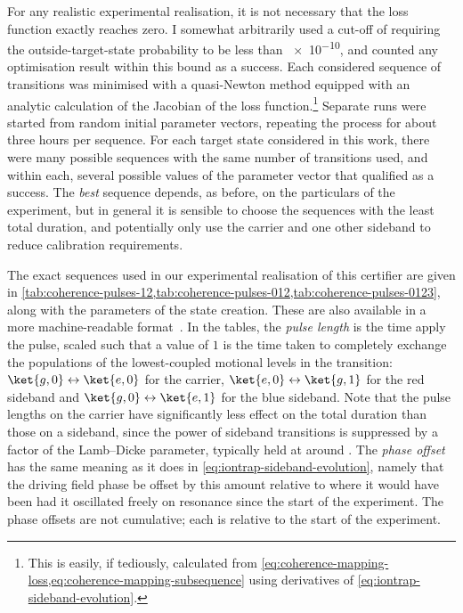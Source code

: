 For any realistic experimental realisation, it is not necessary that the loss function exactly reaches zero.
I somewhat arbitrarily used a cut-off of requiring the outside-target-state probability to be less than \num{e-10}, and counted any optimisation result within this bound as a success.
Each considered sequence of transitions was minimised with a quasi-Newton method equipped with an analytic calculation of the Jacobian of the loss function.\footnote{%
    This is easily, if tediously, calculated from \cref{eq:coherence-mapping-loss,eq:coherence-mapping-subsequence} using derivatives of \cref{eq:iontrap-sideband-evolution}.
}
Separate runs were started from random initial parameter vectors, repeating the process for about three hours per sequence.
For each target state considered in this work, there were many possible sequences with the same number of transitions used, and within each, several possible values of the parameter vector that qualified as a success.
The \emph{best} sequence depends, as before, on the particulars of the experiment, but in general it is sensible to choose the sequences with the least total duration, and potentially only use the carrier and one other sideband to reduce calibration requirements.

The exact sequences used in our experimental realisation of this certifier are given in \cref{tab:coherence-pulses-12,tab:coherence-pulses-012,tab:coherence-pulses-0123}, along with the parameters of the state creation.
These are also available in a more machine-readable format~\cite{Corfield2021Code}.
In the tables, the \emph{pulse length} is the time apply the pulse, scaled such that a value of $1$ is the time taken to completely exchange the populations of the lowest-coupled motional levels in the transition: $\ket{g,0}\leftrightarrow\ket{e,0}$ for the carrier, $\ket{e,0}\leftrightarrow\ket{g,1}$ for the red sideband and $\ket{g,0}\leftrightarrow\ket{e,1}$ for the blue sideband.
Note that the pulse lengths on the carrier have significantly less effect on the total duration than those on a sideband, since the power of sideband transitions is suppressed by a factor of the Lamb--Dicke parameter, typically held at around .
The \emph{phase offset} has the same meaning as it does in \cref{eq:iontrap-sideband-evolution}, namely that the driving field phase be offset by this amount relative to where it would have been had it oscillated freely on resonance since the start of the experiment.
The phase offsets are not cumulative; each is relative to the start of the experiment.

